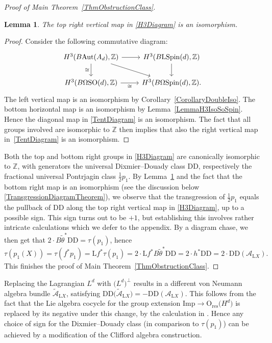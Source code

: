 \documentclass[10pt,a4paper]{amsart}
\numberwithin{equation}{section}
\newtheorem{Lemma}[Theorem]{Lemma}
\newcommand{\Z}{\mathbb{Z}}
\newcommand{\A}{\mathcal{A}}
\newcommand{\SO}{\mathrm{SO}}
\newcommand{\res}{\mathrm{res}}
\newcommand{\Aut}{\mathrm{Aut}}
\newcommand{\Spin}{\mathrm{Spin}}
\newcommand{\Imp}{\mathrm{Imp}}
\renewcommand{\O}{\mathrm{O}}
\renewcommand{\L}{\mathrm{L}}
\newcommand{\DD}{\mathrm{DD}}
\begin{document}
\begin{proof}[Proof of Main Theorem~\ref{ThmObstructionClass}]
\begin{Lemma} \label{LemmaIsomorphismTopRightH3}
The top right vertical map in \eqref{H3Diagram} is an isomorphism.
\end{Lemma}

\begin{proof}
Consider the following commutative diagram:
\begin{equation} \label{TentDiagram}
\begin{tikzcd}
H^3(B \Aut(A_d), \Z) \ar[d, "\cong"'] \ar[r] \ar[dr]
&
H^3(B\L\Spin(d), \Z)
\ar[d]
 \\
H^3(B\Omega\SO(d), \Z) \ar[r, "\cong"'] & H^3(B\Omega\Spin(d), \Z).
\end{tikzcd}
\end{equation}
The left vertical map is an isomorphism by Corollary~\ref{CorollaryDoubleIso}.
The bottom horizontal map is an isomorphism by Lemma~\ref{LemmaH3IsoSoSpin}.
Hence the diagonal map in \eqref{TentDiagram} is an isomorphism.
The fact that all groups involved are isomorphic to $\Z$ then implies that also the right vertical map in~\eqref{TentDiagram} is an isomorphism.
\end{proof}

Both the top and bottom right groups in \eqref{H3Diagram} are canonically isomorphic to $\Z$, with generators the universal Dixmier--Douady class $\DD$, respectively the fractional universal Pontrjagin class $\frac{1}{2}p_1$.
By Lemma~\ref{LemmaIsomorphismTopRightH3} and the fact that the bottom right map is an isomorphism (see the discussion below \eqref{TransgressionDiagramTheorem}), we observe that the transgression of $\frac{1}{2}p_1$ equals the pullback of $\DD$ along the top right vertical map in \eqref{H3Diagram}, up to a possible sign.
This sign turns out to be $+1$, but establishing this involves rather intricate calculations which we defer to the appendix.
By a diagram chase, we then get that $2\cdot B\tilde{\theta}^* \DD = \tau(p_1)$, hence
\begin{equation*}
 \tau(p_1(X)) = \tau(f^* p_1) = \L f^* \tau(p_1) = 2\cdot \L f^* B\tilde{\theta}^* \DD = 2 \cdot h^* \DD = 2\cdot\DD(\A_{\L X}).
\end{equation*}
This finishes the proof of Main Theorem~\ref{ThmObstructionClass}.
\end{proof}

\begin{Remark} \label{RemarkSign}
Replacing the Lagrangian $L^d$ with $\big(L^d\big)^\perp$ results in a different von Neumann algebra bundle $\tilde{\mathcal{A}}_{\L X}$, satisfying $\DD\big(\tilde{\mathcal{A}}_{\L X}\big) = -\DD(\mathcal{A}_{\L X})$.
This follows from the fact that the Lie algebra cocycle for the group extension $\Imp \to \O_{\res}\big(H^d\big)$ is replaced by its negative under this change, by the calculation in \cite[Theorem~6.10]{Araki1}.
Hence any choice of sign for the Dixmier--Douady class (in comparison to $\tau(p_1)$) can be achieved by a modification of the Clifford algebra construction.
\end{Remark}
\end{document}

